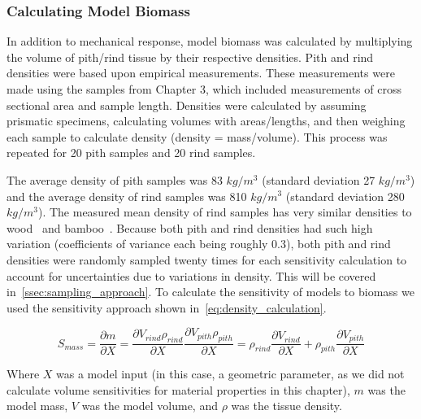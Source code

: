 \subsubsection{Calculating Model Biomass}
\label{sssec:calculating_model_biomass}
In addition to mechanical response, model biomass was calculated by multiplying the volume of pith/rind tissue by their respective densities. Pith and rind densities were based upon empirical measurements. These measurements were made using the samples from Chapter 3, which included measurements of cross sectional area and sample length. Densities were calculated by assuming prismatic specimens, calculating volumes with areas/lengths, and then weighing each sample to calculate density (density = mass/volume). This process was repeated for 20 pith samples and 20 rind samples. 

The average density of pith samples was 83 ${kg/m^{3}}$ (standard deviation 27 ${kg/m^{3}}$) and the average density of rind samples was 810 ${kg/m^{3}}$ (standard deviation 280 ${kg/m^{3}}$). The measured mean density of rind samples has very similar densities to wood~ and bamboo~. Because both pith and rind densities had such high variation (coefficients of variance each being roughly 0.3), both pith and rind densities were randomly sampled twenty times for each sensitivity calculation to account for uncertainties due to variations in density. This will be covered in~\cref{ssec:sampling_approach}.
\newline
\newline
\newline
\newline
\newline
To calculate the sensitivity of models to biomass we used the sensitivity approach shown in~\cref{eq:density_calculation}.

\begin{equation}
	\label{eq:density_calculation}
	S_{mass} = \frac{\partial m}{\partial X} = \frac{\partial V_{rind} \rho_{rind}}{\partial X} \frac{\partial V_{pith} \rho_{pith}}{\partial X} = \rho_{rind} \frac{\partial V_{rind}}{\partial X} + \rho_{pith} \frac{\partial V_{pith}}{\partial X}
\end{equation}

Where ${X}$ was a model input (in this case, a geometric parameter, as we did not calculate volume sensitivities for material properties in this chapter), ${m}$ was the model mass, ${V}$ was the model volume, and ${\rho}$ was the tissue density.

